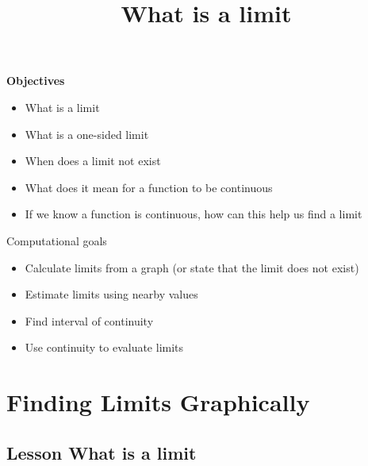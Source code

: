 \documentclass{ximera}
\title{What is a limit}
\newenvironment{objectives}{\begin{remark}\textbf{Objectives}}{\end{remark}}
\begin{document}
\begin{abstract}
\end{abstract}

\maketitle


\begin{objectives}


\begin{itemize}
   \item What is a limit
   \item What is a one-sided limit
    \item When does a limit not exist
    \item What does it mean for a function to be continuous
    \item If we know a function is continuous, how can this help us find a limit
\end{itemize}

Computational goals

\begin{itemize}
    \item Calculate limits from a graph (or state that the limit does not exist)
    \item Estimate limits using nearby values
    \item Find interval of continuity
    \item Use continuity to evaluate limits
\end{itemize}


\end{objectives}

\section{Finding Limits Graphically}
\subsection{Lesson What is a limit}

\begin{center}  
\end{center}
\end{document}
